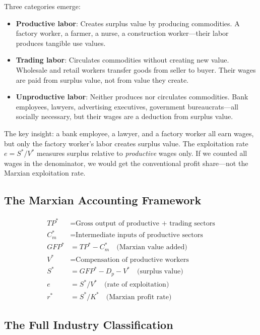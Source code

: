 \documentclass[12pt,a4paper]{article}
\begin{document}
Three categories emerge:
\begin{itemize}
\item \textbf{Productive labor}: Creates surplus value by producing commodities. A factory worker, a farmer, a nurse, a construction worker---their labor produces tangible use values.
\item \textbf{Trading labor}: Circulates commodities without creating new value. Wholesale and retail workers transfer goods from seller to buyer. Their wages are paid from surplus value, not from value they create.
\item \textbf{Unproductive labor}: Neither produces nor circulates commodities. Bank employees, lawyers, advertising executives, government bureaucrats---all socially necessary, but their wages are a deduction from surplus value.
\end{itemize}

The key insight: a bank employee, a lawyer, and a factory worker all earn wages, but only the factory worker's labor creates surplus value. The exploitation rate $e = S^*/V^*$ measures surplus relative to \textit{productive} wages only. If we counted all wages in the denominator, we would get the conventional profit share---not the Marxian exploitation rate.

\subsection{The Marxian Accounting Framework}

\begin{align}
TP^* &= \text{Gross output of productive + trading sectors} \\
C^*_m &= \text{Intermediate inputs of productive sectors} \\
GFP^* &= TP^* - C^*_m \quad \text{(Marxian value added)} \\
V^* &= \text{Compensation of productive workers} \\
S^* &= GFP^* - D_p - V^* \quad \text{(surplus value)} \\
e &= S^*/V^* \quad \text{(rate of exploitation)} \\
r^* &= S^*/K^* \quad \text{(Marxian profit rate)}
\end{align}

\subsection{The Full Industry Classification}
\end{document}
